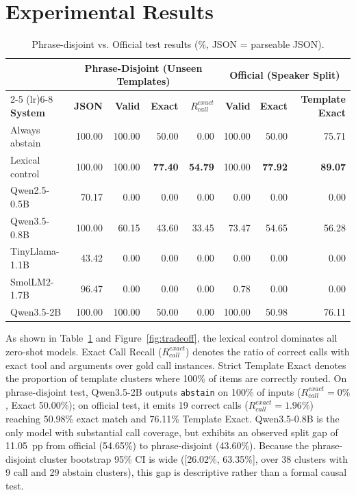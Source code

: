 \documentclass[12pt]{article}
\begin{document}
\section{Experimental Results}

\begin{table}[htbp]
\centering
\caption{Phrase-disjoint vs. Official test results (\%, JSON = parseable JSON).}
\label{tab:results}
\scriptsize
\setlength{\tabcolsep}{3.5pt}
\begin{tabular}{lrrrrrrr}
\toprule
& \multicolumn{4}{c}{\textbf{Phrase-Disjoint (Unseen Templates)}} & \multicolumn{3}{c}{\textbf{Official (Speaker Split)}} \\
\cmidrule(lr){2-5} \cmidrule(lr){6-8}
\textbf{System} & \textbf{JSON} & \textbf{Valid} & \textbf{Exact} & \textbf{$R_{call}^{exact}$} & \textbf{Valid} & \textbf{Exact} & \textbf{Template Exact} \\
\midrule
Always abstain & 100.00 & 100.00 & 50.00 & 0.00 & 100.00 & 50.00 & 75.71 \\
Lexical control & 100.00 & 100.00 & \textbf{77.40} & \textbf{54.79} & 100.00 & \textbf{77.92} & \textbf{89.07} \\
Qwen2.5-0.5B & 70.17 & 0.00 & 0.00 & 0.00 & 0.00 & 0.00 & 0.00 \\
Qwen3.5-0.8B & 100.00 & 60.15 & 43.60 & 33.45 & 73.47 & 54.65 & 56.28 \\
TinyLlama-1.1B & 43.42 & 0.00 & 0.00 & 0.00 & 0.00 & 0.00 & 0.00 \\
SmolLM2-1.7B & 96.47 & 0.00 & 0.00 & 0.00 & 0.78 & 0.00 & 0.00 \\
Qwen3.5-2B & 100.00 & 100.00 & 50.00 & 0.00 & 100.00 & 50.98 & 76.11 \\
\bottomrule
\end{tabular}
\end{table}

As shown in Table~\ref{tab:results} and Figure~\ref{fig:tradeoff}, the lexical control dominates all zero-shot models. Exact Call Recall ($R_{call}^{exact}$) denotes the ratio of correct calls with exact tool and arguments over gold call instances. Strict Template Exact denotes the proportion of template clusters where 100\% of items are correctly routed. On phrase-disjoint test, Qwen3.5-2B outputs \texttt{abstain} on 100\% of inputs ($R_{call}^{exact}=0\%$, Exact 50.00\%); on official test, it emits 19 correct calls ($R_{call}^{exact}=1.96\%$) reaching 50.98\% exact match and 76.11\% Template Exact. Qwen3.5-0.8B is the only model with substantial call coverage, but exhibits an observed split gap of 11.05~pp from official (54.65\%) to phrase-disjoint (43.60\%). Because the phrase-disjoint cluster bootstrap 95\% CI is wide ([26.02\%, 63.35\%], over 38 clusters with 9 call and 29 abstain clusters), this gap is descriptive rather than a formal causal test.
\end{document}
